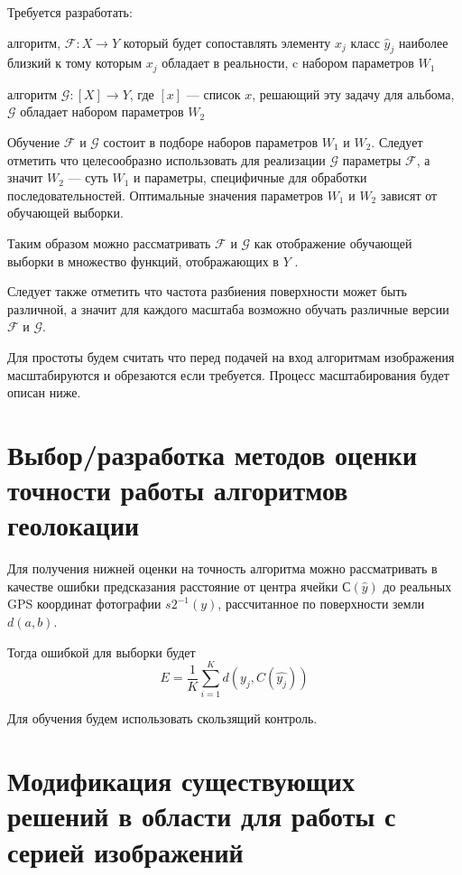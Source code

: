 Требуется разработать:
\begin{compactitem}

\item алгоритм, $ \mathcal{F}: X \to Y $
который будет сопоставлять элементу $ x_j $ класс $ \hat{y}_j $ наиболее близкий к тому которым $ x_j $ обладает в реальности, c набором параметров $ W_1 $
\item алгоритм $ \mathcal{G}: [X] \to Y $, где $ [x] $ --- список $ x $, решающий эту задачу для альбома,  $ \mathcal{G}$ обладает набором параметров $ W_2 $

\end{compactitem}

Обучение $ \mathcal{F} $ и $ \mathcal{G} $ состоит в подборе наборов параметров $ W_1 $ и $ W_2 $. Следует отметить что целесообразно использовать для реализации $ \mathcal{G} $ параметры $ \mathcal{F} $, а значит $ W_2 $ --- суть $ W_1 $ и параметры, специфичные для обработки последовательностей. Оптимальные значения параметров $ W_1 $ и $ W_2$ зависят от обучающей выборки.

Таким образом можно рассматривать $ \mathcal{F} $ и $ \mathcal{G} $
как отображение обучающей выборки в множество функций, отображающих в $ Y $ .

Следует также отметить что частота разбиения поверхности может быть различной, а значит для каждого масштаба возможно обучать различные версии $ \mathcal{F}  $ и $ \mathcal{G} $.

Для простоты будем считать что перед подачей на вход алгоритмам изображения масштабируются и обрезаются если требуется. Процесс масштабирования будет описан ниже.

\section{Выбор/разработка методов оценки точности работы алгоритмов геолокации}

Для получения нижней оценки на точность алгоритма можно рассматривать в качестве ошибки предсказания расстояние от центра ячейки $ С(\hat{y}) $ до реальных GPS координат фотографии $ s2^{-1}(y) $, рассчитанное по поверхности земли $ d(a,b) $.

Тогда ошибкой для выборки будет
$$ E = \frac{1}{K} \sum_{i=1}^{K} {d(y_{j},C(\hat{y_j}))}$$

Для обучения будем использовать скользящий контроль.


\section{Модификация существующих решений в области для работы с серией изображений}

